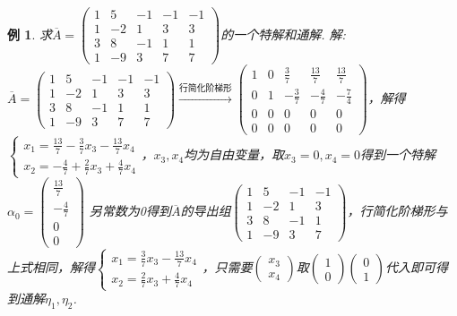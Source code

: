 \documentclass[12pt, a4paper, oneside]{ctexbook}
\newtheorem{example}[theorem]{例}
\begin{document}
\begin{example}
    求$\overline{A} = \left ( \begin{array}{cccc|c}
        1 & 5 & -1 & -1 & -1 \\
        1 & -2 & 1 & 3 & 3 \\
        3 & 8 & -1 & 1 & 1 \\
        1 & -9 & 3 & 7 & 7
    \end{array} \right )$的一个特解和通解. 
    \newline
    解: $\overline{A} = \left ( \begin{array}{cccc|c}
        1 & 5 & -1 & -1 & -1 \\
        1 & -2 & 1 & 3 & 3 \\
        3 & 8 & -1 & 1 & 1 \\
        1 & -9 & 3 & 7 & 7
    \end{array} \right ) \xrightarrow{\mbox{行简化阶梯形}} \left ( \begin{array}{cccc|c}
        1 & 0 & \frac{3}{7} & \frac{13}{7} & \frac{13}{7} \\
        0 & 1 & -\frac{3}{7} & -\frac{4}{7} & -\frac{7}{4} \\
        0 & 0 & 0 & 0 & 0 \\
        0 & 0 & 0 & 0 & 0
    \end{array} \right )$，解得$\begin{cases}
        x_1 = \frac{13}{7} - \frac{3}{7}x_3 - \frac{13}{7}x_4 \\
        x_2 = -\frac{4}{7} + \frac{2}{7}x_3 + \frac{4}{7}x_4
    \end{cases}$，$x_3,x_4$均为自由变量，取$x_3=0,x_4=0$得到一个特解$\alpha_0=\begin{pmatrix}
        \frac{13}{7} \\ -\frac{4}{7} \\ 0 \\ 0
    \end{pmatrix}$
    \newline
    另常数为0得到$\overline{A}$的导出组$\begin{pmatrix}
        1 & 5 & -1 & -1 \\
        1 & -2 & 1 & 3 \\
        3 & 8 & -1 & 1 \\
        1 & -9 & 3 & 7
    \end{pmatrix}$，行简化阶梯形与上式相同，解得$\begin{cases}
        x_1 = \frac{3}{7}x_3 - \frac{13}{7}x_4 \\
        x_2 = \frac{2}{7}x_3 + \frac{4}{7}x_4
    \end{cases}$，只需要$\begin{pmatrix}
        x_3 \\ x_4
    \end{pmatrix}$取$\begin{pmatrix}
        1 \\ 0
    \end{pmatrix} \begin{pmatrix}
        0 \\ 1
    \end{pmatrix}$代入即可得到通解$\eta_1, \eta_2$. 
\end{example}
\end{document}
